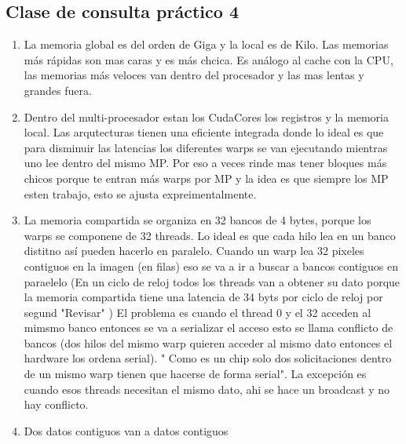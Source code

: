 \documentclass[]{scrartcl}
\begin{document}
\subsection{Clase de consulta práctico 4}

\begin{enumerate}
	\item La memoria global es del orden de Giga y la local es de Kilo. Las memorias más rápidas son mas caras y es más chcica. Es análogo al cache con la CPU, las memorias más veloces van dentro del procesador y las mas lentas y grandes fuera.
	\item Dentro del multi-procesador estan los CudaCores los registros y la memoria local. Las arqutecturas tienen una eficiente integrada donde lo ideal es que para disminuir las latencias los diferentes warps se van ejecutando mientras uno lee dentro del mismo MP. Por eso a veces rinde mas tener bloques más chicos porque te entran más warps por MP y la idea es que siempre los MP esten trabajo, esto se ajusta expreimentalmente. 
	\item La memoria compartida se organiza en 32 bancos de 4 bytes, porque los warps se componene de 32 threads. Lo ideal es que cada hilo lea en un banco distitno así pueden hacerlo en paralelo. Cuando un warp lea 32 pixeles contiguos en la imagen (en filas) eso se va a ir a buscar a bancos contiguos en paraelelo (En un ciclo de reloj todos los threads van a obtener su dato porque la memoria compartida tiene una latencia de 34 byts por ciclo de reloj por segund "Revisar" )
	El problema es cuando el thread 0 y el 32 acceden al mimsmo banco entonces se va a serializar el acceso esto se llama conflicto de bancos (dos hilos del mismo warp quieren acceder al mismo dato entonces el hardware los ordena serial). " Como es un chip solo dos solicitaciones dentro de un mismo warp tienen que hacerse de forma serial". La excepción es cuando esos threads necesitan el mismo dato, ahi se hace un broadcast y no hay conflicto.
	\item Dos datos contiguos van a datos contiguos 
\end{enumerate}
\end{document}
